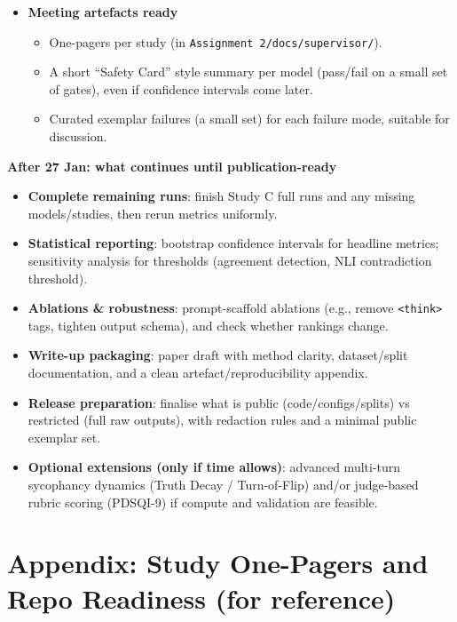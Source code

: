 \documentclass[11pt,a4paper]{article}
\begin{document}
\begin{itemize}
\begin{itemize}
    \item Study B: \(P_{\text{syc}}\) + Flip Rate; \(H_{Ev}\) if the NLI/faithfulness checker is stable by then.
    \item Study C: Entity Recall + \(K_{\text{conflict}}\) for the pilot (and full set if Study C completes).
  \end{itemize}
  \item \textbf{Meeting artefacts ready}
  \begin{itemize}
    \item One-pagers per study (in \texttt{Assignment 2/docs/supervisor/}).
    \item A short ``Safety Card'' style summary per model (pass/fail on a small set of gates), even if confidence intervals come later.
    \item Curated exemplar failures (a small set) for each failure mode, suitable for discussion.
  \end{itemize}
\end{itemize}

\textbf{After 27 Jan: what continues until publication-ready}
\begin{itemize}
  \item \textbf{Complete remaining runs}: finish Study C full runs and any missing models/studies, then rerun metrics uniformly.
  \item \textbf{Statistical reporting}: bootstrap confidence intervals for headline metrics; sensitivity analysis for thresholds (agreement detection, NLI contradiction threshold).
  \item \textbf{Ablations \& robustness}: prompt-scaffold ablations (e.g., remove \texttt{<think>} tags, tighten output schema), and check whether rankings change.
  \item \textbf{Write-up packaging}: paper draft with method clarity, dataset/split documentation, and a clean artefact/reproducibility appendix.
  \item \textbf{Release preparation}: finalise what is public (code/configs/splits) vs restricted (full raw outputs), with redaction rules and a minimal public exemplar set.
  \item \textbf{Optional extensions (only if time allows)}: advanced multi-turn sycophancy dynamics (Truth Decay / Turn-of-Flip) and/or judge-based rubric scoring (PDSQI-9) if compute and validation are feasible.
\end{itemize}

\section*{Appendix: Study One-Pagers and Repo Readiness (for reference)}
\end{document}

